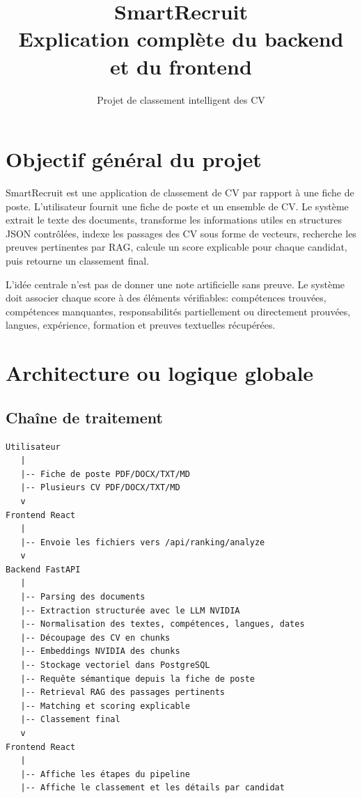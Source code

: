 \documentclass[12pt,a4paper]{article}
\title{\textbf{SmartRecruit}\\Explication complète du backend et du frontend}
\author{Projet de classement intelligent des CV}
\date{}
\begin{document}
\maketitle
\tableofcontents
\newpage

\section{Objectif général du projet}

SmartRecruit est une application de classement de CV par rapport à une fiche de poste. L'utilisateur fournit une fiche de poste et un ensemble de CV. Le système extrait le texte des documents, transforme les informations utiles en structures JSON contrôlées, indexe les passages des CV sous forme de vecteurs, recherche les preuves pertinentes par RAG, calcule un score explicable pour chaque candidat, puis retourne un classement final.

L'idée centrale n'est pas de donner une note artificielle sans preuve. Le système doit associer chaque score à des éléments vérifiables: compétences trouvées, compétences manquantes, responsabilités partiellement ou directement prouvées, langues, expérience, formation et preuves textuelles récupérées.

\section{Architecture ou logique globale}

\subsection{Chaîne de traitement}

\begin{verbatim}
Utilisateur
   |
   |-- Fiche de poste PDF/DOCX/TXT/MD
   |-- Plusieurs CV PDF/DOCX/TXT/MD
   v
Frontend React
   |
   |-- Envoie les fichiers vers /api/ranking/analyze
   v
Backend FastAPI
   |
   |-- Parsing des documents
   |-- Extraction structurée avec le LLM NVIDIA
   |-- Normalisation des textes, compétences, langues, dates
   |-- Découpage des CV en chunks
   |-- Embeddings NVIDIA des chunks
   |-- Stockage vectoriel dans PostgreSQL
   |-- Requête sémantique depuis la fiche de poste
   |-- Retrieval RAG des passages pertinents
   |-- Matching et scoring explicable
   |-- Classement final
   v
Frontend React
   |
   |-- Affiche les étapes du pipeline
   |-- Affiche le classement et les détails par candidat
\end{verbatim}
\end{document}
